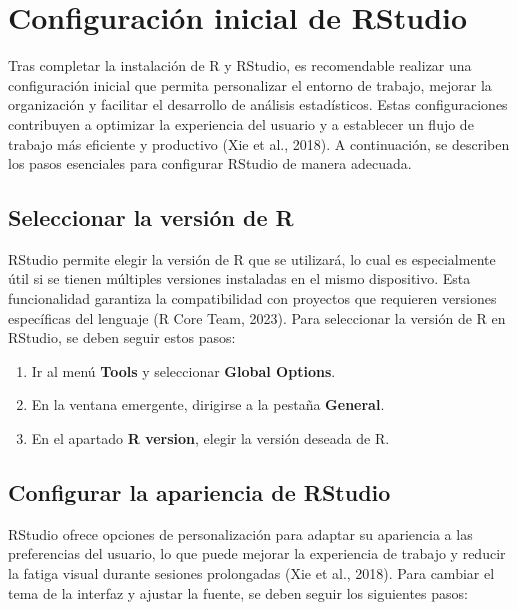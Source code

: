 \documentclass[
  spanish,
  letterpaper,
]{book}
\begin{document}
\section{Configuración inicial de
RStudio}\label{configuraciuxf3n-inicial-de-rstudio}

Tras completar la instalación de R y RStudio, es recomendable realizar
una configuración inicial que permita personalizar el entorno de
trabajo, mejorar la organización y facilitar el desarrollo de análisis
estadísticos. Estas configuraciones contribuyen a optimizar la
experiencia del usuario y a establecer un flujo de trabajo más eficiente
y productivo (Xie et al., 2018). A continuación, se describen los pasos
esenciales para configurar RStudio de manera adecuada.

\subsection{Seleccionar la versión de
R}\label{seleccionar-la-versiuxf3n-de-r}

RStudio permite elegir la versión de R que se utilizará, lo cual es
especialmente útil si se tienen múltiples versiones instaladas en el
mismo dispositivo. Esta funcionalidad garantiza la compatibilidad con
proyectos que requieren versiones específicas del lenguaje (R Core Team,
2023). Para seleccionar la versión de R en RStudio, se deben seguir
estos pasos:

\begin{enumerate}
\def\labelenumi{\arabic{enumi}.}
\item
  Ir al menú \textbf{Tools} y seleccionar \textbf{Global Options}.
\item
  En la ventana emergente, dirigirse a la pestaña \textbf{General}.
\item
  En el apartado \textbf{R version}, elegir la versión deseada de R.
\end{enumerate}

\subsection{Configurar la apariencia de
RStudio}\label{configurar-la-apariencia-de-rstudio}

RStudio ofrece opciones de personalización para adaptar su apariencia a
las preferencias del usuario, lo que puede mejorar la experiencia de
trabajo y reducir la fatiga visual durante sesiones prolongadas (Xie et
al., 2018). Para cambiar el tema de la interfaz y ajustar la fuente, se
deben seguir los siguientes pasos:
\end{document}
